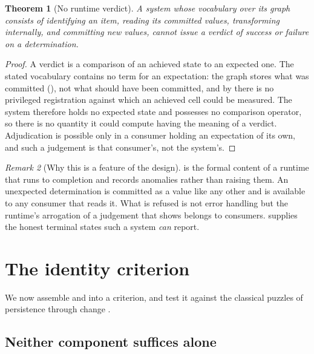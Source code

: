 \documentclass[11pt,twocolumn,a4paper]{article}
\theoremstyle{dirthm}
\newtheorem{theorem}{Theorem}[section]
\theoremstyle{definition}
\theoremstyle{remark}
\newtheorem{remark}[theorem]{Remark}
\begin{document}
\begin{theorem}[No runtime verdict]
\label{thm:no-verdict}
A system whose vocabulary over its graph consists of identifying an item,
reading its committed values, transforming internally, and committing new
values, cannot issue a verdict of success or failure on a determination.
\end{theorem}

\begin{proof}
A verdict is a comparison of an achieved state to an expected one. The stated
vocabulary contains no term for an expectation: the graph stores what was
committed (), not what should have been committed, and by
 there is no privileged registration against which an
achieved cell could be measured. The system therefore holds no expected state
and possesses no comparison operator, so there is no quantity it could
compute having the meaning of a verdict. Adjudication is possible only in a
consumer holding an expectation of its own, and such a judgement is that
consumer's, not the system's.
\end{proof}

\begin{remark}[Why this is a feature of the design]
\label{rem:no-verdict-feature}
 is the formal content of a runtime that runs to
completion and records anomalies rather than raising them. An unexpected
determination is committed as a value like any other and is available to any
consumer that reads it. What is refused is not error handling but the
runtime's arrogation of a judgement that  shows belongs to
consumers.  supplies the honest terminal states such a
system \emph{can} report.
\end{remark}

\section{The identity criterion}
\label{sec:identity-criterion}

We now assemble  and  into a criterion,
and test it against the classical puzzles of persistence through change
\citep{plutarch,lewis1976,wiggins2001}.

\subsection{Neither component suffices alone}
\end{document}
